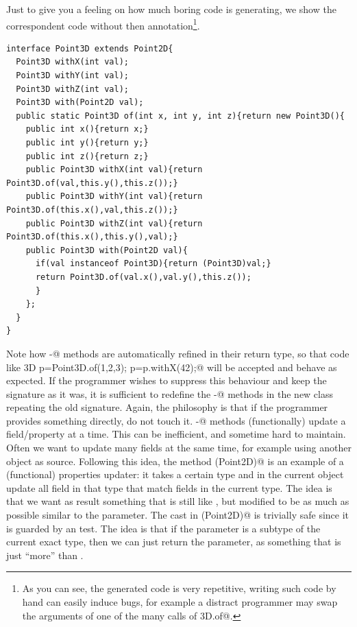 Just to give you a feeling on how much boring code \mixin is generating,  we show the correspondent code without then \mixin annotation\footnote{
As you can see, the generated code is very repetitive, writing such code by hand can easily induce bugs, for example a distract programmer may
swap the arguments of one of the many calls of \Q@Point3D.of@.
}.\begin{lstlisting}
interface Point3D extends Point2D{
  Point3D withX(int val);
  Point3D withY(int val);
  Point3D withZ(int val);
  Point3D with(Point2D val);
  public static Point3D of(int x, int y, int z){return new Point3D(){
    public int x(){return x;} 
    public int y(){return y;}
    public int z(){return z;}
    public Point3D withX(int val){return Point3D.of(val,this.y(),this.z());}
    public Point3D withY(int val){return Point3D.of(this.x(),val,this.z());}
    public Point3D withZ(int val){return Point3D.of(this.x(),this.y(),val);}
    public Point3D with(Point2D val){
      if(val instanceof Point3D){return (Point3D)val;}
      return Point3D.of(val.x(),val.y(),this.z());
      }
    };
  }
}
\end{lstlisting}
Note how \Q@with-@ methods are automatically refined in their return type, so that code like 
\Q@Point3D p=Point3D.of(1,2,3); p=p.withX(42);@ will be accepted and behave as expected. If the programmer wishes to suppress this behaviour and keep the signature as it was, it is sufficient to redefine the \Q@with-@ methods in the new class repeating the old signature.
Again, the philosophy is that if the programmer provides something directly, \mixin do not touch it.
\Q@with-@ methods (functionally) update a field/property at a time.
This can be inefficient, and sometime hard to maintain.
Often we want to update many fields at the same time, for example using another object as source.
Following this idea, the method \Q@with(Point2D)@ is an example of a (functional) properties updater: 
it takes a certain type and in the current object update all field in that type that match fields in the current type.
The idea is that we want as result something that is still like \Q@this@, but modified to be as much as possible similar to the parameter.
The cast in \Q@with(Point2D)@ is trivially safe since it is guarded by an \Q@instanceof@ test. The idea is that if the parameter is a subtype of the current exact type, then we can just return the parameter, as something that is just ``more'' than \Q@this@.

